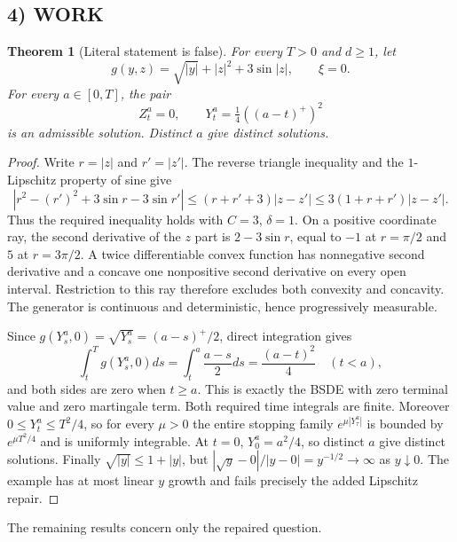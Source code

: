 \documentclass[11pt,a4paper]{article}
\newtheorem{theorem}{Theorem}
\theoremstyle{definition}
\begin{document}
\subsection*{4) WORK}
\begin{theorem}[Literal statement is false]
For every $T>0$ and $d\ge1$, let
\[
 g(y,z)=\sqrt{|y|}+|z|^2+3\sin|z|,\qquad \xi=0.
\]
For every $a\in[0,T]$, the pair
\[
 Z^a_t=0,\qquad Y^a_t=\tfrac14((a-t)^+)^2
\]
is an admissible solution. Distinct $a$ give distinct solutions.
\end{theorem}
\begin{proof}
Write $r=|z|$ and $r'=|z'|$. The reverse triangle inequality and the $1$-Lipschitz property of sine give
\[
 |r^2-(r')^2+3\sin r-3\sin r'|
 \le(r+r'+3)|z-z'|
 \le3(1+r+r')|z-z'|.
\]
Thus the required inequality holds with $C=3$, $\delta=1$. On a positive coordinate ray, the second derivative of the $z$ part is $2-3\sin r$, equal to $-1$ at $r=\pi/2$ and $5$ at $r=3\pi/2$. A twice differentiable convex function has nonnegative second derivative and a concave one nonpositive second derivative on every open interval. Restriction to this ray therefore excludes both convexity and concavity. The generator is continuous and deterministic, hence progressively measurable.

Since $g(Y^a_s,0)=\sqrt{Y^a_s}=(a-s)^+/2$, direct integration gives
\[
 \int_t^Tg(Y^a_s,0)ds=\int_t^a\frac{a-s}{2}ds
 =\frac{(a-t)^2}{4}\quad(t<a),
\]
and both sides are zero when $t\ge a$. This is exactly the BSDE with zero terminal value and zero martingale term. Both required time integrals are finite. Moreover
$0\le Y^a_t\le T^2/4$, so for every $\mu>0$ the entire stopping family $e^{\mu|Y^a_\tau|}$ is bounded by $e^{\mu T^2/4}$ and is uniformly integrable. At $t=0$, $Y^a_0=a^2/4$, so distinct $a$ give distinct solutions. Finally $\sqrt{|y|}\le1+|y|$, but
$|\sqrt y-0|/|y-0|=y^{-1/2}\to\infty$ as $y\downarrow0$. The example has at most linear $y$ growth and fails precisely the added Lipschitz repair.
\end{proof}

The remaining results concern only the repaired question.
\end{document}
